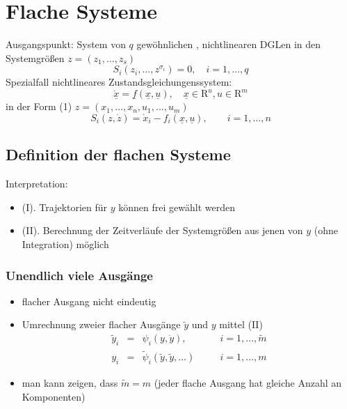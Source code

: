 \documentclass[ngerman]{tudscrreprt}
\begin{document}
\chapter{Flache Systeme}
Ausgangspunkt: System von $q$ gewöhnlichen , nichtlinearen DGLen in den Systemgrößen $z = (z_1,\dots, z_s)$ 
\begin{equation*}
S_i (z_i,\dots, z^{\sigma_i}) = 0, \quad i=1,\dots,q \tag{1}
\end{equation*}
Spezialfall nichtlineares Zustandsgleichungenssystem: 
\begin{equation*}
\underline{\dot{x}} = \underline{f}(\underline{x},\underline{u}),\quad \underline{x}\in \mathrm{R}^u, u\in \mathrm{R}^m
\end{equation*}
in der Form (1) $z=(x_1, \dots, x_n, u_1,\dots, u_m)$
\begin{equation*}
S_i(z,\dot z) = \dot{x}_i - f_i(\underline{x},\underline{u}),\qquad i=1,\dots, n
\end{equation*}
\section{Definition der flachen Systeme}
Interpretation:
\begin{itemize}
\item{(I)}. Trajektorien für $y$ können frei gewählt werden
\item{(II)}. Berechnung der Zeitverläufe der Systemgrößen aus jenen von $y$ (ohne Integration) möglich 
\end{itemize}
\subsection{Unendlich viele Ausgänge}
\begin{itemize}
\item flacher Ausgang nicht eindeutig 
\item Umrechnung zweier flacher Ausgänge $\tilde y$ und $y$ mittel (II)
\begin{equation*}
\begin{matrix}
\tilde y_i &=& \psi_i(y, \dot{y}),&\quad& i = 1,\dots, \tilde m\\ 
y_i &=& \tilde{\psi}_i(\tilde y, \tilde{y}, \dots)&\quad& i =1,\dots, m
\end{matrix}
\end{equation*}
\item man kann zeigen, dass $\tilde m = m$ (jeder flache Ausgang hat gleiche Anzahl an Komponenten)
\end{itemize}
\end{document}
